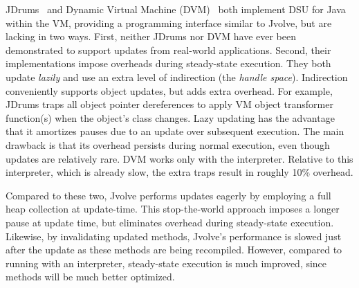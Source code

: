 \documentclass[9pt]{sigplanconf}
\newcommand{\DSU}{{\sc Jvolve}}
\begin{document}
JDrums~\cite{ritzau00dynamic} and Dynamic Virtual Machine
(DVM)~\cite{Mala00a} both implement DSU for Java within the VM,
providing a programming interface similar to \DSU, but are lacking in
two ways.  First, neither JDrums nor DVM have ever been demonstrated
to support updates from real-world applications.  Second,
their implementations impose overheads during steady-state execution.
They both update \emph{lazily} and use
an extra level of indirection (the \emph{handle
  space}).  Indirection conveniently supports
object updates, but adds extra overhead.  For example, JDrums traps
all object pointer dereferences to apply VM object transformer
function(s) when the object's class changes.  Lazy updating has the
advantage that it amortizes  pauses due to an update over
subsequent execution.  The main drawback is that its overhead persists
during normal execution, even though updates are relatively rare.  DVM
works only with the interpreter.  Relative to this interpreter, which
is already slow, the extra traps result in roughly 10\% overhead.

Compared to these two, \DSU{} performs updates eagerly by employing a
full heap collection at update-time.  This stop-the-world approach imposes a longer pause at
update time, but eliminates overhead during steady-state execution.
Likewise, by invalidating updated methods, \DSU's performance is
slowed just after the update as these methods are being recompiled.
However, compared to running with an interpreter, steady-state
execution is much improved, since methods will be much better
optimized.


\end{document}
